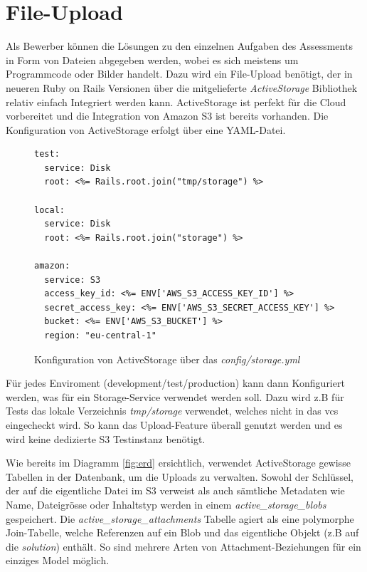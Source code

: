 \section{File-Upload}

Als Bewerber können die Lösungen zu den einzelnen Aufgaben des Assessments in Form von Dateien abgegeben werden, wobei
es sich meistens um Programmcode oder Bilder handelt. Dazu wird ein File-Upload benötigt, der in neueren Ruby on Rails Versionen über die mitgelieferte \emph{ActiveStorage} Bibliothek relativ einfach Integriert werden kann. 
ActiveStorage ist perfekt für die Cloud vorbereitet und die Integration von Amazon S3 ist bereits vorhanden. Die Konfiguration von ActiveStorage erfolgt über eine YAML-Datei.

\begin{figure}[H]
\begin{codebox}
\begin{verbatim}
test:
  service: Disk
  root: <%= Rails.root.join("tmp/storage") %>

local:
  service: Disk
  root: <%= Rails.root.join("storage") %>

amazon:
  service: S3
  access_key_id: <%= ENV['AWS_S3_ACCESS_KEY_ID'] %>
  secret_access_key: <%= ENV['AWS_S3_SECRET_ACCESS_KEY'] %>
  bucket: <%= ENV['AWS_S3_BUCKET'] %>
  region: "eu-central-1"
\end{verbatim}
\end{codebox}
\caption{\label{fig:active-storage-config}Konfiguration von ActiveStorage über das \emph{config/storage.yml}}
\end{figure}

Für jedes Enviroment (development/test/production) kann dann Konfiguriert werden, was für ein Storage-Service verwendet werden soll.
Dazu wird z.B für Tests das lokale Verzeichnis \emph{tmp/storage} verwendet, welches nicht in das \gls{vcs} eingecheckt wird. So kann das
Upload-Feature überall genutzt werden und es wird keine dedizierte S3 Testinstanz benötigt.

Wie bereits im Diagramm \ref{fig:erd} ersichtlich, verwendet ActiveStorage gewisse Tabellen in der Datenbank, um die Uploads zu verwalten.
Sowohl der Schlüssel, der auf die eigentliche Datei im S3 verweist als auch sämtliche Metadaten wie Name, Dateigrösse oder Inhaltstyp werden in einem \emph{active\_storage\_blobs} gespeichert.
Die \emph{active\_storage\_attachments} Tabelle agiert als eine polymorphe Join-Tabelle, welche Referenzen auf ein Blob und das eigentliche Objekt (z.B auf die \emph{solution}) enthält. 
So sind mehrere Arten von Attachment-Beziehungen für ein einziges Model möglich.

